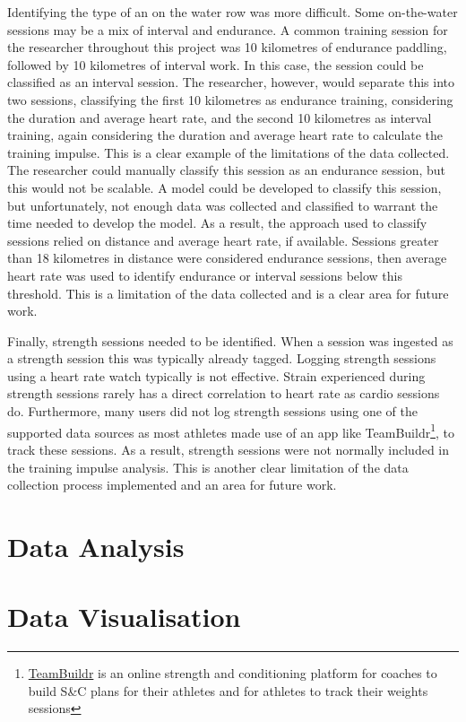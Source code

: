 Identifying the type of an on the water row was more difficult. Some on-the-water sessions may be a mix of interval and endurance. A common training session for the researcher throughout this project was 10 kilometres of endurance paddling, followed by 10 kilometres of interval work. In this case, the session could be classified as an interval session. The researcher, however, would separate this into two sessions, classifying the first 10 kilometres as endurance training, considering the duration and average heart rate, and the second 10 kilometres as interval training, again considering the duration and average heart rate to calculate the training impulse. This is a clear example of the limitations of the data collected. The researcher could manually classify this session as an endurance session, but this would not be scalable. A model could be developed to classify this session, but unfortunately, not enough data was collected and classified to warrant the time needed to develop the model. As a result, the approach used to classify sessions relied on distance and average heart rate, if available. Sessions greater than 18 kilometres in distance were considered endurance sessions, then average heart rate was used to identify endurance or interval sessions below this threshold. This is a limitation of the data collected and is a clear area for future work.

Finally, strength sessions needed to be identified. When a session was ingested as a strength session this was typically already tagged. Logging strength sessions using a heart rate watch typically is not effective. Strain experienced during strength sessions rarely has a direct correlation to heart rate as cardio sessions do. Furthermore, many users did not log strength sessions using one of the supported data sources as most athletes made use of an app like TeamBuildr\footnote{\href{https://www.teambuildr.com/}{TeamBuildr} is an online strength and conditioning platform for coaches to build S\&C plans for their athletes and for athletes to track their weights sessions}, to track these sessions. As a result, strength sessions were not normally included in the training impulse analysis.  This is another clear limitation of the data collection process implemented and an area for future work. 

\section{\label{sec:data-anyl}Data Analysis}


\section{\label{sec:data-viz}Data Visualisation}